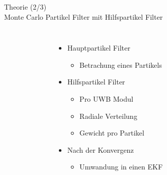 \documentclass{beamer}
\begin{document}
\begin{frame}{Theorie (2/3)\\\normalsize{Monte Carlo Partikel Filter mit Hilfspartikel Filter}}
\begin{columns}
\begin{overlayarea}{\textwidth}{.7\textheight}
{\begin{figure}
						\caption{\cite{blanco2008pure}}
					\end{figure}
				}
			\end{overlayarea}
			\begin{itemize}
				\item Hauptpartikel Filter
				\begin{itemize}
					\item Betrachung eines Partikels
				\end{itemize}
				\item Hilfspartikel Filter
				\begin{itemize}
					\item Pro UWB Modul
					\item Radiale Verteilung
					\item Gewicht pro Partikel
				\end{itemize}
				\item<4-> Nach der Konvergenz
				\begin{itemize}
					\item Umwandung in einen EKF
				\end{itemize}
			\end{itemize}
	\end{columns}
\end{frame}
\end{document}
